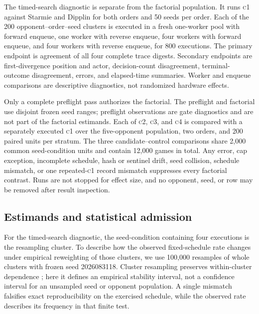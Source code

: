\documentclass[aps,reprint,superscriptaddress,longbibliography,floatfix]{revtex4-2}
\newcommand{\COne}{\textsc{c1}}
\newcommand{\CTwo}{\textsc{c2}}
\newcommand{\CThree}{\textsc{c3}}
\newcommand{\CFour}{\textsc{c4}}
\begin{document}
The timed-search diagnostic is separate from the factorial population.  It
runs \COne{} against Starmie and Dipplin for both orders and 50 seeds per order.
Each of the 200 opponent--order--seed clusters is executed in a fresh one-worker
pool with forward enqueue, one worker with reverse enqueue, four workers with
forward enqueue, and four workers with reverse enqueue, for 800 executions.
The primary endpoint is agreement of all four complete trace digests.  Secondary
endpoints are first-divergence position and actor, decision-count disagreement,
terminal-outcome disagreement, errors, and elapsed-time summaries.  Worker and
enqueue comparisons are descriptive diagnostics, not randomized hardware
effects.

Only a complete preflight pass authorizes the factorial.  The preflight and
factorial use disjoint frozen seed ranges; preflight observations are gate
diagnostics and are not part of the factorial estimands.  Each of \CTwo{},
\CThree{}, and \CFour{} is compared with a separately executed \COne{} over the
five-opponent population, two orders, and 200 paired units per stratum.  The
three candidate--control comparisons share 2,000 common seed-condition units
and contain 12,000 games in total.  Any error, cap exception, incomplete
schedule, hash or sentinel drift,
seed collision, schedule mismatch, or one repeated-\COne{} record mismatch
suppresses every factorial contrast.  Runs are not stopped for effect size, and
no opponent, seed, or row may be removed after result inspection.

\subsection{Estimands and statistical admission}

For the timed-search diagnostic, the seed-condition containing four executions
is the resampling cluster.  To describe how the observed fixed-schedule rate
changes under empirical reweighting of those clusters, we use 100,000 resamples
of whole clusters with frozen seed 2026083118.  Cluster resampling preserves
within-cluster dependence \cite{field2007clustered}; here it defines an
empirical stability interval, not a confidence interval for an unsampled seed or
opponent population.  A single mismatch falsifies exact reproducibility on the
exercised schedule, while the observed rate describes its frequency in that
finite test.
\end{document}
